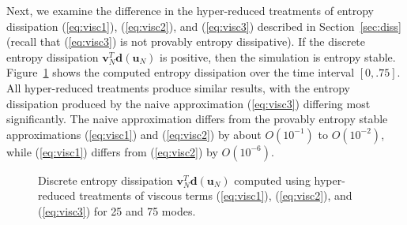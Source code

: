 \documentclass[preprint,10pt]{elsarticle}
\theoremstyle{definition}
\theoremstyle{lemma}
\theoremstyle{theorem}
\theoremstyle{assumption}
\newcommand{\LRp}[1]{\left( #1 \right)}
\begin{document}
Next, we examine the difference in the hyper-reduced treatments of entropy dissipation (\ref{eq:visc1}), (\ref{eq:visc2}), and (\ref{eq:visc3}) described in Section~\ref{sec:diss} (recall that (\ref{eq:visc3}) is not provably entropy dissipative).  If the discrete entropy dissipation $\bm{v}_N^T\bm{d}(\bm{u}_N)$ is positive, then the simulation is entropy stable.  Figure~\ref{fig:entropydiss}  shows the computed entropy dissipation over the time interval $[0,.75]$.  All hyper-reduced treatments produce similar results, with the entropy dissipation produced by the naive approximation (\ref{eq:visc3}) differing most significantly.  The naive approximation differs from the provably entropy stable approximations (\ref{eq:visc1}) and (\ref{eq:visc2}) by about $O\LRp{10^{-1}}$ to $O\LRp{10^{-2}}$, while (\ref{eq:visc1}) differs from (\ref{eq:visc2}) by $O\LRp{10^{-6}}$.  

\begin{figure}[!h]
\centering
{}
\hspace{2em}
\caption{Discrete entropy dissipation $\bm{v}_N^T\bm{d}(\bm{u}_N)$ computed using hyper-reduced treatments of viscous terms (\ref{eq:visc1}), (\ref{eq:visc2}), and (\ref{eq:visc3}) for 25 and 75 modes.}
\label{fig:entropydiss}
\end{figure}
\end{document}
